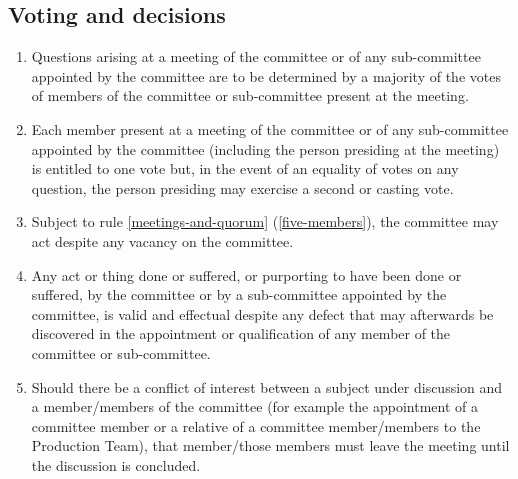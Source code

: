 \subsection{Voting and decisions}
\begin{enumerate}
  \item Questions arising at a meeting of the committee or of any sub-committee appointed by the committee are to be determined by a majority of the votes of members of the committee or sub-committee present at the meeting.
  \item Each member present at a meeting of the committee or of any sub-committee appointed by the committee (including the person presiding at the meeting) is entitled to one vote but, in the event of an equality of votes on any question, the person presiding may exercise a second or casting vote.
  \item Subject to rule \ref{meetings-and-quorum} (\ref{five-members}), the committee may act despite any vacancy on the committee.
  \item Any act or thing done or suffered, or purporting to have been done or suffered, by the committee or by a sub-committee appointed by the committee, is valid and effectual despite any defect that may afterwards be discovered in the appointment or qualification of any member of the committee or sub-committee.
  \item Should there be a conflict of interest between a subject under discussion and a member/members of the committee (for example the appointment of a committee member or a relative of a committee member/members to the Production Team), that member/those members must leave the meeting until the discussion is concluded.
\end{enumerate}

